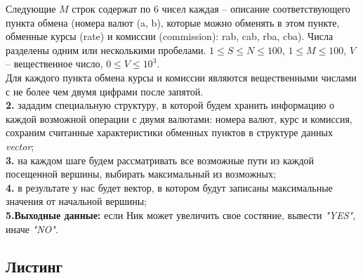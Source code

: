\documentclass[a5paper, 10pt]{article}
\theoremstyle{definition}
\theoremstyle{plain}
\theoremstyle{remark}
\begin{document}
Следующие $M$ строк содержат по 6 чисел каждая -- описание соответствующего пункта обмена (номера валют (a, b), которые можно обменять в этом пункте, обменные курсы (rate) и комиссии (commission): rab, cab, rba, cba). Числа разделены одним или несколькими пробелами. $1 \leq S \leq N \leq 100$, $1 \leq M \leq 100$, $V$ -- вещественное число, $0 \leq V \leq 10^3$.\\

 Для каждого пункта обмена курсы и комиссии являются вещественными числами с не более чем двумя цифрами после запятой.\\

\textbf{2.} зададим специальную структуру, в которой будем хранить информацию о каждой возможной операции с двумя валютами: номера валют, курс и комиссия, сохраним считанные характеристики обменных пунктов в структуре данных \textit{vector}; \\

\textbf{3.}  на каждом шаге будем рассматривать все возможные пути из каждой посещенной вершины, выбирать максимальный из возможных;\\

\textbf{4.}  в результате у нас будет вектор, в котором будут записаны максимальные значения от начальной вершины;\\

\textbf{5.Выходные данные:} если Ник может увеличить свое состяние, вывести \textit{"YES"}, иначе \textit{"NO"}. 

\newpage
\subsection{Листинг}
\end{document}
